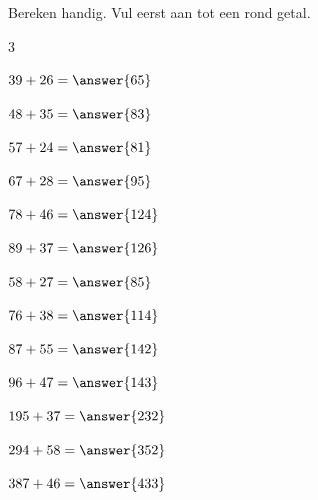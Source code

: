 \documentclass{ximera}
\begin{document}
\begin{oefening}{\oefB\ESS}

    Bereken handig. Vul eerst aan tot een rond getal.
    
    \begin{multicols}{3}
    
    \begin{question} \(39+26=\answer{65}\) \end{question}
    
    \begin{question} \(48+35=\answer{83}\) \end{question}
    
    \begin{question} \(57+24=\answer{81}\) \end{question}
    
    \begin{question} \(67+28=\answer{95}\) \end{question}
    
    \begin{question} \(78+46=\answer{124}\) \end{question}
    
    \begin{question} \(89+37=\answer{126}\) \end{question}
    
    \begin{question} \(58+27=\answer{85}\) \end{question}
    
    \begin{question} \(76+38=\answer{114}\) \end{question}
    
    \begin{question} \(87+55=\answer{142}\) \end{question}
    
    \begin{question} \(96+47=\answer{143}\) \end{question}
    
    \begin{question} \(195+37=\answer{232}\) \end{question}
    
    \begin{question} \(294+58=\answer{352}\) \end{question}
    
    \begin{question} \(387+46=\answer{433}\) \end{question}
    

\end{multicols}
\end{oefening}
\end{document}
